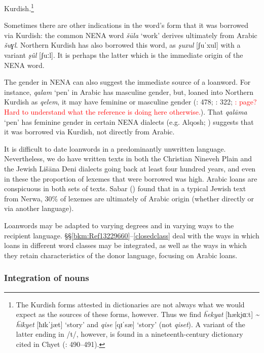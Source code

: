 \documentclass[output=paper]{langsci/langscibook}
\begin{document}
Kurdish.\footnote{The Kurdish forms attested in dictionaries are not always what we would expect as the sources of these forms, however. Thus we find \textit{ḧekyat} [ħækjɑːt] \textit{{\textasciitilde} ḧikyet} [ħɪk\textrm{ˈ}jæt] ‘story’  and \textit{qise} [qɪ\textrm{ˈ}sæ] ‘story’ (not \textit{qiset}). A variant of the latter ending in /t/, however, is found in a nineteenth-century dictionary cited in Chyet (\citeyear{Chyet2003}: 490–491).}

Sometimes there are other indications in the word’s form that it was borrowed via Kurdish: the common NENA word \textit{šūla} ‘work’ derives ultimately from Arabic \textit{šuɣl}. Northern Kurdish has also borrowed this word, as \textit{şuxul} [ʃuˈxul] with a variant \textit{şûl} [ʃuːl]. It is perhaps the latter which is the immediate origin of the NENA word.

The gender in NENA can also suggest the immediate source of a loanword. For instance, \textit{qalam} ‘pen’ in Arabic has masculine gender, but, loaned into Northern Kurdish as \textit{qelem}, it may have feminine or masculine gender (\citealt{Chyet2003}: 478; \citealt{Rizgar1993}: 322; \citealt{Blanc1964}\textcolor{red}{: page? Hard to understand what the reference is doing here otherwise.}). That \textit{qalāma} ‘pen’ has feminine gender in certain NENA dialects (e.g. Alqosh; \citealt[199]{Coghill2004}) suggests that it was borrowed via Kurdish, not directly from Arabic.

It is difficult to date loanwords in a predominantly unwritten language. Nevertheless, we do have written texts in both the Christian Nineveh Plain and the Jewish Lišāna Deni dialects going back at least four hundred years, and even in these the proportion of lexemes that were borrowed was high. Arabic loans are conspicuous in both sets of texts. Sabar (\citeyear[208]{Sabar1984}) found that in a typical Jewish text from Nerwa, 30\% of lexemes are ultimately of Arabic origin (whether directly or via another language).

Loanwords may be adapted to varying degrees and in varying ways to the recipient language. §§\ref{bkm:Ref13229660}–\ref{closedclass} deal with the ways in which loans in different word classes may be integrated, as well as the ways in which they retain characteristics of the donor language, focusing on Arabic loans.

\subsubsection{\label{bkm:Ref13229660}Integration of nouns}
\end{document}

